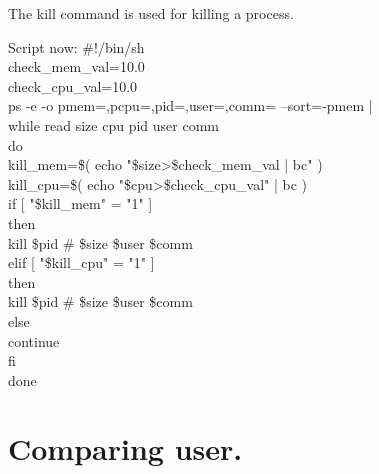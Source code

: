 \documentclass[12pt,a4paper]{article}
\begin{document}
The kill command is used for killing a process.
\newline
\begin{flushleft}
Script now:
\newline
\#!/bin/sh\\
check\_mem\_val=10.0\\
check\_cpu\_val=10.0\\
ps -e -o pmem=,pcpu=,pid=,user=,comm= --sort=-pmem |\\
  while read size cpu pid user comm\\
  do\\
kill\_mem=\$( echo "\$size>\$check\_mem\_val | bc" )\\
kill\_cpu=\$( echo "\$cpu>\$check\_cpu\_val" | bc )\\
 if [ "\$kill\_mem" = "1" ]\\
      then\\
        kill \$pid \# \$size \$user \$comm\\
      elif [ "\$kill\_cpu" = "1" ]\\
      then\\
        kill \$pid \# \$size \$user \$comm\\
      else\\
        continue\\
      fi\\
  done\\
\end{flushleft}
\newpage
\section{Comparing user.}
\end{document}
